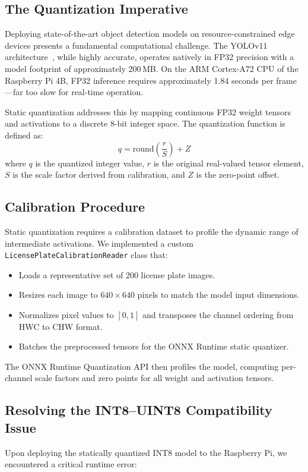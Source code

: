\documentclass[conference]{IEEEtran}
\begin{document}
\subsection{The Quantization Imperative}
Deploying state-of-the-art object detection models on resource-constrained edge devices presents a fundamental computational challenge. The YOLOv11 architecture~\cite{b5}, while highly accurate, operates natively in FP32 precision with a model footprint of approximately 200\,MB. On the ARM Cortex-A72 CPU of the Raspberry Pi 4B, FP32 inference requires approximately 1.84 seconds per frame---far too slow for real-time operation.

Static quantization addresses this by mapping continuous FP32 weight tensors and activations to a discrete 8-bit integer space. The quantization function is defined as:
\begin{equation}
q = \text{round}\!\left(\frac{r}{S}\right) + Z
\label{eq:quant}
\end{equation}
where $q$ is the quantized integer value, $r$ is the original real-valued tensor element, $S$ is the scale factor derived from calibration, and $Z$ is the zero-point offset.

\subsection{Calibration Procedure}
Static quantization requires a calibration dataset to profile the dynamic range of intermediate activations. We implemented a custom \texttt{LicensePlateCalibrationReader} class that:
\begin{itemize}
\item Loads a representative set of 200 license plate images.
\item Resizes each image to $640\times640$ pixels to match the model input dimensions.
\item Normalizes pixel values to $[0, 1]$ and transposes the channel ordering from HWC to CHW format.
\item Batches the preprocessed tensors for the ONNX Runtime static quantizer.
\end{itemize}

The ONNX Runtime Quantization API then profiles the model, computing per-channel scale factors and zero points for all weight and activation tensors.

\subsection{Resolving the INT8--UINT8 Compatibility Issue}
Upon deploying the statically quantized INT8 model to the Raspberry Pi, we encountered a critical runtime error:
\end{document}
